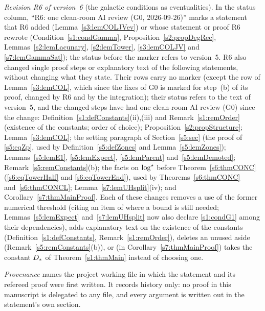 \emph{Revision R6 of version~6} (the galactic conditions as eventualities). In
the status column, ``R6: one clean-room AI review (G0, 2026-09-26)'' marks a
statement that R6 added
(Lemma~\ref{s3:lemCOLJVev}) or whose statement or proof R6 rewrote
(Condition~\ref{s1:condGamma}, Proposition~\ref{s2:propDegRec},
Lemmas~\ref{s2:lemLacunary}, \ref{s2:lemTower}, \ref{s3:lemCOLJV} and
\ref{s7:lemGammaSat}); the status before the marker refers to version~5. R6 also
changed single proof steps or explanatory text of the following statements,
without changing what they state. Their rows carry no marker (except the row
of Lemma~\ref{s3:lemCOL}, which since the fixes of G0 is marked for step~(b) of
its proof, changed by R6 and by the integration); their status
refers to the text of version~5, and the changed steps have had one clean-room
AI review (G0) since the change:
Definition~\ref{s1:defConstants}(ii),(iii) and Remark~\ref{s1:remOrder}
(existence of the constants; order of choice);
Proposition~\ref{s2:propStructure}; Lemma~\ref{s3:lemCOL}; the setting
paragraph of Section~\ref{s5:sec} (the proof of \eqref{s5:eqZp}, used by
Definition~\ref{s5:defZones} and Lemma~\ref{s5:lemZones}); Lemmas~\ref{s5:lemE1},
\ref{s5:lemExpect}, \ref{s5:lemParent} and~\ref{s5:lemDemoted};
Remark~\ref{s5:remConstants}(b); the facts on $\log^{\star}$ before
Theorem~\ref{s6:thmCONC} (\eqref{s6:eqTowerHalf} and \eqref{s6:eqTowerEnd}),
used by Theorems~\ref{s6:thmCONC} and~\ref{s6:thmCONCL};
Lemma~\ref{s7:lemUHsplit}(iv); and Corollary~\ref{s7:thmMainProof}. Each of
these changes removes a use of the former numerical threshold (citing an item of
 where a bound is still needed; Lemmas~\ref{s5:lemExpect}
and~\ref{s7:lemUHsplit} now also declare \ref{s1:condG1} among their
dependencies), adds explanatory text on the existence of the constants
(Definition~\ref{s1:defConstants}, Remark~\ref{s1:remOrder}), deletes an unused
aside (Remark~\ref{s5:remConstants}(b)), or (in
Corollary~\ref{s7:thmMainProof}) takes the constant $D_{*}$ of
Theorem~\ref{s1:thmMain} instead of choosing one.

\emph{Provenance} names the project working file in which the statement and its
refereed proof were first written. It records history only: no proof in this
manuscript is delegated to any file, and every argument is written out in the
statement's own section.


